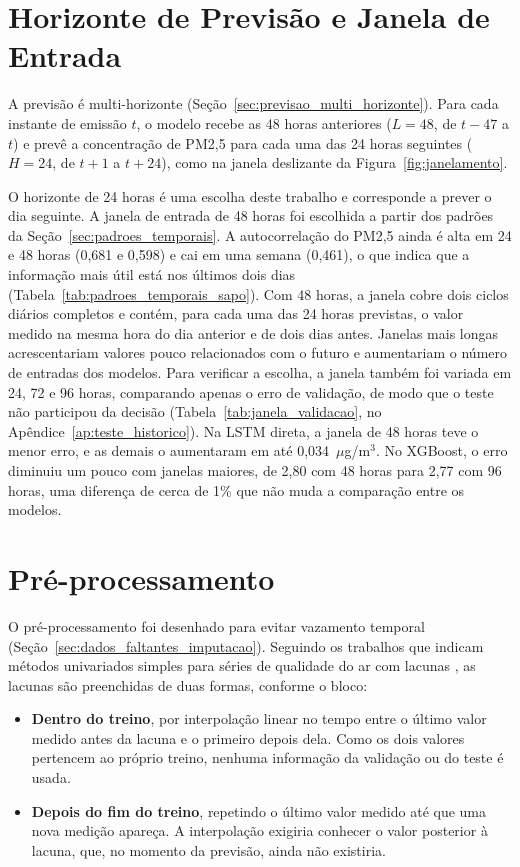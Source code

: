 \section{Horizonte de Previsão e Janela de Entrada}
\label{sec:formulacao_tarefa}

A previsão é multi-horizonte (Seção~\ref{sec:previsao_multi_horizonte}). Para cada instante de emissão \(t\), o modelo recebe as 48 horas anteriores (\(L=48\), de \(t-47\) a \(t\)) e prevê a concentração de PM2,5 para cada uma das 24 horas seguintes (\(H=24\), de \(t+1\) a \(t+24\)), como na janela deslizante da Figura~\ref{fig:janelamento}.

O horizonte de 24 horas é uma escolha deste trabalho e corresponde a prever o dia seguinte. A janela de entrada de 48 horas foi escolhida a partir dos padrões da Seção~\ref{sec:padroes_temporais}. A autocorrelação do PM2,5 ainda é alta em 24 e 48 horas (0,681 e 0,598) e cai em uma semana (0,461), o que indica que a informação mais útil está nos últimos dois dias (Tabela~\ref{tab:padroes_temporais_sapo}). Com 48 horas, a janela cobre dois ciclos diários completos e contém, para cada uma das 24 horas previstas, o valor medido na mesma hora do dia anterior e de dois dias antes. Janelas mais longas acrescentariam valores pouco relacionados com o futuro e aumentariam o número de entradas dos modelos. Para verificar a escolha, a janela também foi variada em 24, 72 e 96 horas, comparando apenas o erro de validação, de modo que o teste não participou da decisão (Tabela~\ref{tab:janela_validacao}, no Apêndice~\ref{ap:teste_historico}). Na LSTM direta, a janela de 48 horas teve o menor erro, e as demais o aumentaram em até 0,034~\(\mu\)g/m\(^3\). No XGBoost, o erro diminuiu um pouco com janelas maiores, de 2,80 com 48 horas para 2,77 com 96 horas, uma diferença de cerca de 1\% que não muda a comparação entre os modelos.

\section{Pré-processamento}
\label{sec:preprocessamento}

O pré-processamento foi desenhado para evitar vazamento temporal (Seção~\ref{sec:dados_faltantes_imputacao}). Seguindo os trabalhos que indicam métodos univariados simples para séries de qualidade do ar com lacunas \cite{junninen2004methods,moritz2017imputets,hadeed2020imputation}, as lacunas são preenchidas de duas formas, conforme o bloco:

\begin{itemize}
    \item \textbf{Dentro do treino}, por interpolação linear no tempo entre o último valor medido antes da lacuna e o primeiro depois dela. Como os dois valores pertencem ao próprio treino, nenhuma informação da validação ou do teste é usada.
    \item \textbf{Depois do fim do treino}, repetindo o último valor medido até que uma nova medição apareça. A interpolação exigiria conhecer o valor posterior à lacuna, que, no momento da previsão, ainda não existiria.
\end{itemize}

